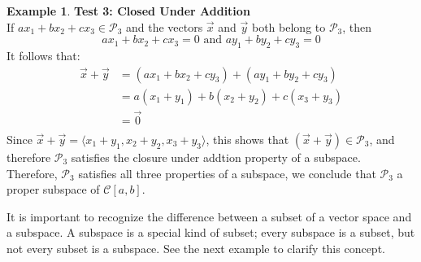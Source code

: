 \documentclass{book}
\theoremstyle{definition}
\newtheorem{example}{Example}[definition]
\theoremstyle{remark}
\newcommand{\cc}[1]{\mathcal{#1}}
\newcommand{\ovec}{\big \langle}
\newcommand{\cvec}{\big \rangle}
\begin{document}
\begin{example}
        \textbf{Test 3: Closed Under Addition} \\
            If $ax_1 + bx_2 + cx_3 \in \cc{P}_3$ and the vectors $\vec{x}$ and $\vec{y}$ both belong to $\cc{P}_3$, then
                \begin{equation*}
                    ax_1 + bx_2 + cx_3 = 0 \text{ and } ay_1 + by_2 + cy_3 = 0
                \end{equation*}
            It follows that: 
                \begin{align*}
                    \vec{x} + \vec{y} & = (ax_1 + bx_2 + cy_3) + (ay_1 + by_2 + cy_3) \\
                        & = a(x_1 + y_1) + b(x_2 + y_2) + c(x_3 + y_3) \\
                        & = \vec{0} \\
                \end{align*}
            Since $\vec{x} + \vec{y} = \ovec x_1 + y_1, x_2 + y_2, x_3 + y_3 \cvec$, this shows that $(\vec{x} + \vec{y}) \in \cc{P}_3$, and therefore $\cc{P}_3$ satisfies the closure under addtion property of a subspace. \\
        
        Therefore, $\cc{P}_3$ satisfies all three properties of a subspace, we conclude that $\cc{P}_3$ a proper subspace of $\cc{C}[a,b]$.
\end{example}

\newpage
It is important to recognize the difference between a subset of a vector space and a subspace. A subspace is a special kind of subset; every subspace is a subset, but not every subset is a subspace. See the next example to clarify this concept.
\end{document}
